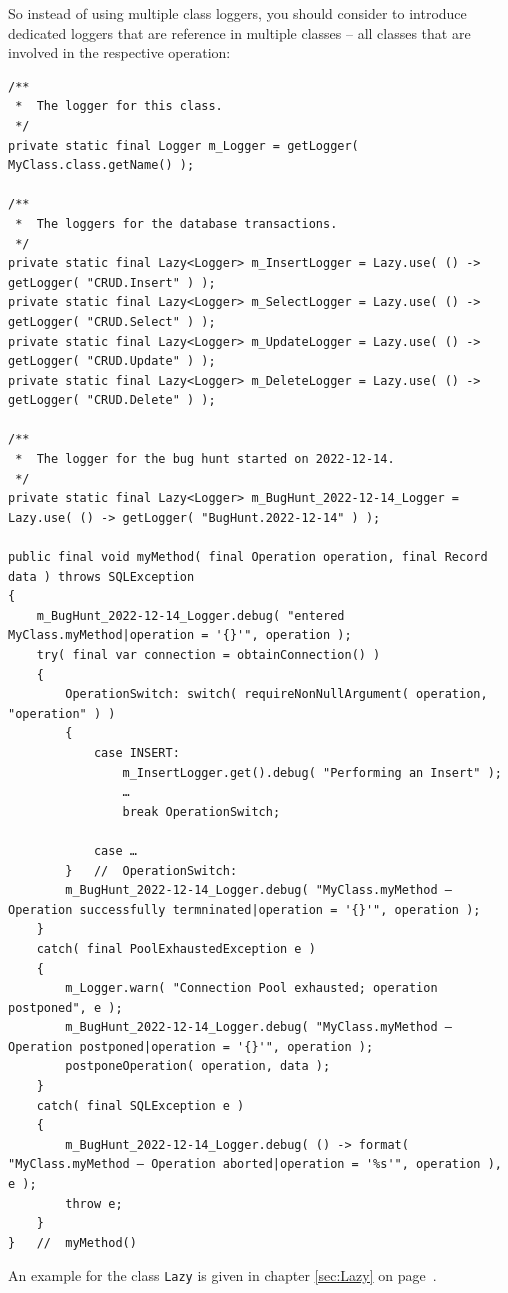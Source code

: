 \documentclass[11pt,a4paper, titlepage, parskip=half, headsepline, footsepline, cleardoublepage=current, headheight=1cm]{scrbook}
\newcommand*{\tqvref}[1]{\hyperref[{#1}]{\ref*{#1}} on page~\pageref{#1}}
\begin{document}
So instead of using multiple class loggers, you should consider to introduce dedicated loggers that are reference in multiple classes – all classes that are involved in the respective operation:
\begin{lstlisting}
/**
 *  The logger for this class.
 */
private static final Logger m_Logger = getLogger( MyClass.class.getName() ); 

/**
 *  The loggers for the database transactions.
 */
private static final Lazy<Logger> m_InsertLogger = Lazy.use( () -> getLogger( "CRUD.Insert" ) );
private static final Lazy<Logger> m_SelectLogger = Lazy.use( () -> getLogger( "CRUD.Select" ) );
private static final Lazy<Logger> m_UpdateLogger = Lazy.use( () -> getLogger( "CRUD.Update" ) );
private static final Lazy<Logger> m_DeleteLogger = Lazy.use( () -> getLogger( "CRUD.Delete" ) );

/**
 *  The logger for the bug hunt started on 2022-12-14.
 */
private static final Lazy<Logger> m_BugHunt_2022-12-14_Logger = Lazy.use( () -> getLogger( "BugHunt.2022-12-14" ) );

public final void myMethod( final Operation operation, final Record data ) throws SQLException
{
    m_BugHunt_2022-12-14_Logger.debug( "entered MyClass.myMethod|operation = '{}'", operation );
    try( final var connection = obtainConnection() )
    {
        OperationSwitch: switch( requireNonNullArgument( operation, "operation" ) )
        {
            case INSERT:
                m_InsertLogger.get().debug( "Performing an Insert" );
                …
                break OperationSwitch;
                
            case …
        }   //  OperationSwitch:
        m_BugHunt_2022-12-14_Logger.debug( "MyClass.myMethod – Operation successfully termninated|operation = '{}'", operation );       
    }
    catch( final PoolExhaustedException e )
    {
        m_Logger.warn( "Connection Pool exhausted; operation postponed", e );
        m_BugHunt_2022-12-14_Logger.debug( "MyClass.myMethod – Operation postponed|operation = '{}'", operation );       
        postponeOperation( operation, data ); 
    }    
    catch( final SQLException e )
    {
        m_BugHunt_2022-12-14_Logger.debug( () -> format( "MyClass.myMethod – Operation aborted|operation = '%s'", operation ), e );
        throw e;
    }
}   //  myMethod() 
\end{lstlisting}

An example for the class \lstinline|Lazy| is given in chapter \tqvref{sec:Lazy}.
\end{document}
